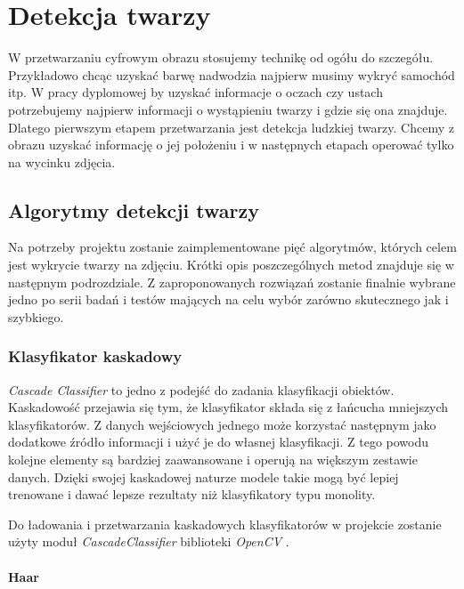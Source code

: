 \newpage

\section{Detekcja twarzy} \label{section:face_detection}

W przetwarzaniu cyfrowym obrazu stosujemy technikę od ogółu do szczegółu. Przykładowo chcąc uzyskać barwę nadwodzia najpierw musimy wykryć samochód itp. W pracy dyplomowej by uzyskać informacje o oczach czy ustach potrzebujemy najpierw informacji o wystąpieniu twarzy i gdzie się ona znajduje. Dlatego pierwszym etapem przetwarzania jest detekcja ludzkiej twarzy. Chcemy z obrazu uzyskać informację o jej położeniu i w następnych etapach operować tylko na wycinku zdjęcia. 

\subsection{Algorytmy detekcji twarzy}

Na potrzeby projektu zostanie zaimplementowane pięć algorytmów, których celem jest wykrycie twarzy na zdjęciu. Krótki opis poszczególnych metod znajduje się w następnym podrozdziale. Z zaproponowanych rozwiązań zostanie finalnie wybrane jedno po serii badań i testów mających na celu wybór zarówno skutecznego jak i szybkiego.

\subsubsection{Klasyfikator kaskadowy}
\textit{Cascade Classifier} to jedno z podejść do zadania klasyfikacji obiektów. Kaskadowość przejawia się tym, że klasyfikator składa się z łańcucha mniejszych klasyfikatorów. Z danych wejściowych jednego może korzystać następnym jako dodatkowe źródło informacji i użyć je do własnej klasyfikacji. Z tego powodu kolejne elementy są bardziej zaawansowane i operują na większym zestawie danych. Dzięki swojej kaskadowej naturze modele takie mogą być lepiej trenowane i dawać lepsze rezultaty niż klasyfikatory typu monolity.

\vspace{5mm}

Do ładowania i przetwarzania kaskadowych klasyfikatorów w projekcie zostanie użyty moduł \textit{CascadeClassifier} \cite{cascade_opencv} biblioteki \textit{OpenCV} \cite{opencv}. 

\paragraph{Haar}

